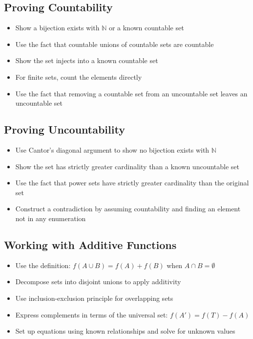 \subsection*{Proving Countability}
\begin{itemize}
\item Show a bijection exists with $\mathbb{N}$ or a known countable set
\item Use the fact that countable unions of countable sets are countable
\item Show the set injects into a known countable set
\item For finite sets, count the elements directly
\item Use the fact that removing a countable set from an uncountable set leaves an uncountable set
\end{itemize}

\subsection*{Proving Uncountability}
\begin{itemize}
\item Use Cantor's diagonal argument to show no bijection exists with $\mathbb{N}$
\item Show the set has strictly greater cardinality than a known uncountable set
\item Use the fact that power sets have strictly greater cardinality than the original set
\item Construct a contradiction by assuming countability and finding an element not in any enumeration
\end{itemize}

\subsection*{Working with Additive Functions}
\begin{itemize}
\item Use the definition: $f(A \cup B) = f(A) + f(B)$ when $A \cap B = \emptyset$
\item Decompose sets into disjoint unions to apply additivity
\item Use inclusion-exclusion principle for overlapping sets
\item Express complements in terms of the universal set: $f(A') = f(T) - f(A)$
\item Set up equations using known relationships and solve for unknown values
\end{itemize}


